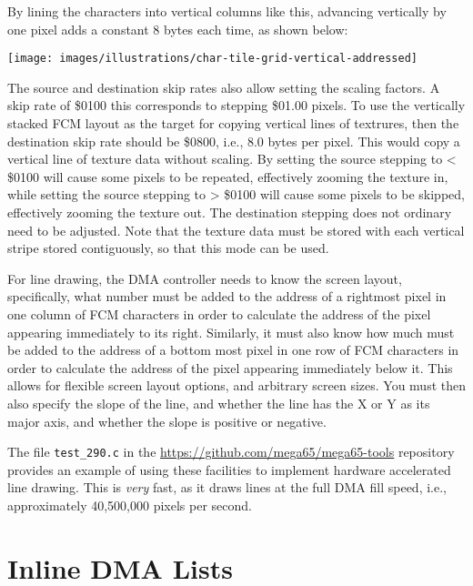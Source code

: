 By lining the characters into vertical columns like this, advancing vertically by one pixel adds a constant 8 bytes each time, as shown below:

\begin{center}
\texttt{[image: images/illustrations/char-tile-grid-vertical-addressed]}
\end{center}


The source and destination
skip rates also allow setting the scaling factors.  A skip rate of \$0100 this corresponds to stepping \$01.00 pixels.
To use the vertically stacked FCM layout as the target for copying vertical lines of textrures, then the destination
skip rate should be \$0800, i.e., 8.0 bytes per pixel.  This would copy a vertical line of texture data without scaling.
By setting the source stepping to < \$0100 will cause some pixels to be repeated, effectively zooming the texture in,
while setting the source stepping to > \$0100 will cause some pixels to be skipped, effectively zooming the texture out.
The destination stepping does not ordinary need to be adjusted.  Note that the texture data must be stored with each
vertical stripe stored contiguously, so that this mode can be used.

For line drawing, the DMA controller needs to know the screen layout, specifically, what number must be added to the
address of a rightmost pixel in one column of FCM characters in order to calculate the address of the pixel appearing
immediately to its right. Similarly, it must also know how much must be added to the address of a bottom most pixel in
one row of FCM characters in order to calculate the address of the pixel appearing immediately below it.  This allows
for flexible screen layout options, and arbitrary screen sizes.  You must then also specify the slope of the line, and
whether the line has the X or Y as its major axis, and whether the slope is positive or negative.

The file {\tt test\_290.c}
in the \url{https://github.com/mega65/mega65-tools} repository provides an example of using these facilities to
implement hardware accelerated line drawing. This is {\em very} fast, as it draws lines at the full DMA fill speed,
i.e., approximately 40,500,000 pixels per second.

\section{Inline DMA Lists}

